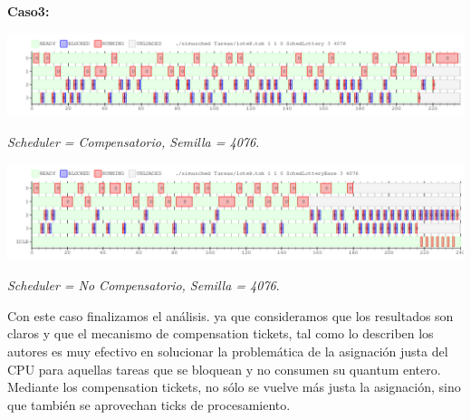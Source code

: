 \vspace{2mm}

\textbf{Caso3:}

\vspace{2mm}

\includegraphics[width=1\textwidth]{./Graficos/Ej10v2/Task8/ej9_5.png}
\begin{center}
 \textit{Scheduler = Compensatorio, Semilla = 4076}.
\end{center}


\includegraphics[width=1\textwidth]{./Graficos/Ej10v2/Task8/ej9_5_base.png}
\begin{center}
 \textit{Scheduler = No Compensatorio, Semilla = 4076}.
\end{center}

\vspace{2mm}

Con este caso finalizamos el an\'alisis. ya que consideramos que los resultados son claros y que el mecanismo de compensation tickets, tal como lo describen los autores es muy efectivo en solucionar la problem\'atica de la asignaci\'on justa del CPU para aquellas tareas que se bloquean y no consumen su quantum entero. Mediante los compensation tickets, no s\'olo se vuelve m\'as justa la asignaci\'on, sino que tambi\'en se aprovechan ticks de procesamiento.